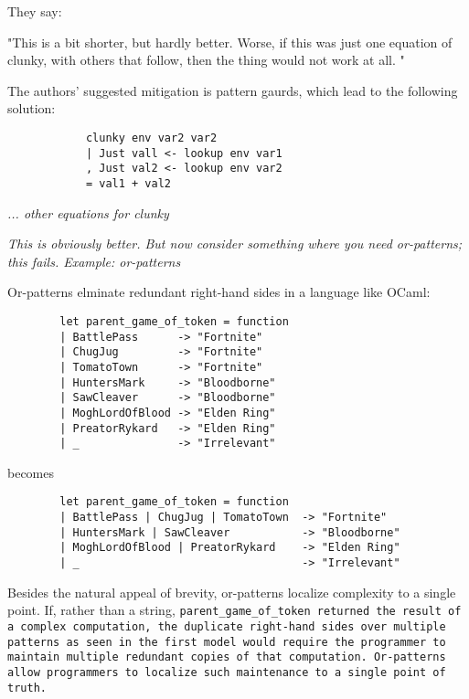 \documentclass[manuscript,screen,review, 12pt]{acmart}
\begin{document}
\begin{outline}[enumerate]
        They say: 
        
        "This is a bit shorter, but hardly better. Worse, if this was just one equation
        of clunky, with others that follow, then the thing would not work at all. " 
        
        The authors' suggested mitigation is pattern gaurds, which lead to the following
        solution: 
        \begin{center}
        \begin{verbatim}
            clunky env var2 var2    
            | Just vall <- lookup env var1
            , Just val2 <- lookup env var2
            = val1 + val2
        \end{verbatim}
        \it{... other equations for clunky}
        \end{center}    
        
        \it{This is obviously better. But now consider something where you need 
        or-patterns; this fails. }
        \2 Example: or-patterns

        Or-patterns elminate redundant right-hand sides in a language like
        OCaml: 

    \begin{center}
    \begin{verbatim}
        let parent_game_of_token = function 
        | BattlePass      -> "Fortnite"
        | ChugJug         -> "Fortnite"
        | TomatoTown      -> "Fortnite"
        | HuntersMark     -> "Bloodborne"
        | SawCleaver      -> "Bloodborne"
        | MoghLordOfBlood -> "Elden Ring"
        | PreatorRykard   -> "Elden Ring"
        | _               -> "Irrelevant"
    \end{verbatim}
    \end{center}    

            becomes 

    \begin{center}
    \begin{verbatim}
        let parent_game_of_token = function 
        | BattlePass | ChugJug | TomatoTown  -> "Fortnite"
        | HuntersMark | SawCleaver           -> "Bloodborne"
        | MoghLordOfBlood | PreatorRykard    -> "Elden Ring"
        | _                                  -> "Irrelevant"
    \end{verbatim}
    \end{center}    

    Besides the natural appeal of brevity, or-patterns localize complexity to a
    single point. If, rather than a string, \tt{parent\_game\_of\_token}
    returned the result of a complex computation, the duplicate right-hand sides
    over multiple patterns as seen in the first model would require the
    programmer to maintain multiple redundant copies of that computation.
     Or-patterns allow programmers to
    localize such maintenance to a single point of truth. 


\end{outline}
\end{document}
